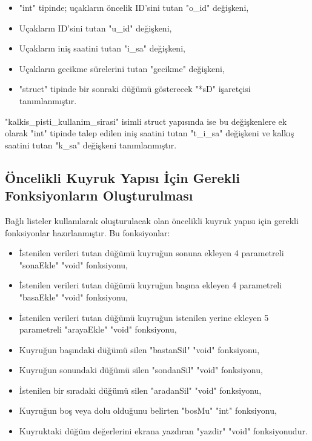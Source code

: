 \documentclass[conference]{IEEEtran}
\begin{document}
\begin{itemize}
    \item "int" tipinde; uçakların öncelik ID'sini tutan "o\_id" değişkeni,
    \item Uçakların ID'sini tutan "u\_id" değişkeni,
    \item Uçakların iniş saatini tutan "i\_sa" değişkeni,
    \item Uçakların gecikme sürelerini tutan "gecikme" değişkeni,
    \item "struct" tipinde bir sonraki düğümü gösterecek "*sD" işaretçisi 
    tanımlanmıştır.\\
\end{itemize}

"kalkis\_pisti\_kullanim\_sirasi" isimli struct yapısında ise bu
değişkenlere ek olarak "int" tipinde talep edilen iniş saatini tutan "t\_i\_sa" 
değişkeni ve kalkış saatini tutan "k\_sa" değişkeni tanımlanmıştır.\\

\subsection{Öncelikli Kuyruk Yapısı İçin Gerekli Fonksiyonların Oluşturulması}
Bağlı listeler kullanılarak oluşturulacak olan öncelikli kuyruk yapısı için 
gerekli fonksiyonlar hazırlanmıştır. Bu fonksiyonlar:\\

\begin{itemize}
    \item İstenilen verileri tutan düğümü kuyruğun sonuna ekleyen 4 parametreli 
    "sonaEkle" "void" fonksiyonu,
    \item İstenilen verileri tutan düğümü kuyruğun başına ekleyen 4 parametreli 
    "basaEkle" "void" fonksiyonu,
    \item İstenilen verileri tutan düğümü kuyruğun istenilen yerine ekleyen 5 
    parametreli "arayaEkle" "void" fonksiyonu,
    \item Kuyruğun başındaki düğümü silen "bastanSil" "void" fonksiyonu,
    \item Kuyruğun sonundaki düğümü silen "sondanSil" "void" fonksiyonu,
    \item İstenilen bir sıradaki düğümü silen "aradanSil" "void" fonksiyonu,
    \item Kuyruğun boş veya dolu olduğunu belirten "bosMu" "int" fonksiyonu,
    \item Kuyruktaki düğüm değerlerini ekrana yazdıran "yazdir" "void" 
    fonksiyonudur.\\
\end{itemize}
\end{document}
